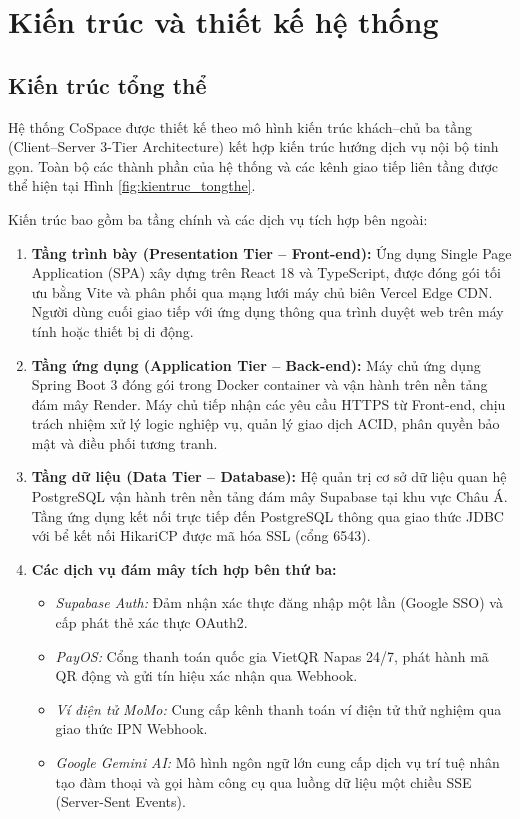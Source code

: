 \chapter{Kiến trúc và thiết kế hệ thống}
\label{ch:thietke}

\section{Kiến trúc tổng thể}
\label{sec:kientruc}

Hệ thống CoSpace được thiết kế theo mô hình kiến trúc khách--chủ ba tầng (Client--Server 3-Tier Architecture) kết hợp kiến trúc hướng dịch vụ nội bộ tinh gọn. Toàn bộ các thành phần của hệ thống và các kênh giao tiếp liên tầng được thể hiện tại Hình \ref{fig:kientruc_tongthe}.


Kiến trúc bao gồm ba tầng chính và các dịch vụ tích hợp bên ngoài:
\begin{enumerate}
    \item \textbf{Tầng trình bày (Presentation Tier -- Front-end):} Ứng dụng Single Page Application (SPA) xây dựng trên React 18 và TypeScript, được đóng gói tối ưu bằng Vite và phân phối qua mạng lưới máy chủ biên Vercel Edge CDN. Người dùng cuối giao tiếp với ứng dụng thông qua trình duyệt web trên máy tính hoặc thiết bị di động.
    \item \textbf{Tầng ứng dụng (Application Tier -- Back-end):} Máy chủ ứng dụng Spring Boot 3 đóng gói trong Docker container và vận hành trên nền tảng đám mây Render. Máy chủ tiếp nhận các yêu cầu HTTPS từ Front-end, chịu trách nhiệm xử lý logic nghiệp vụ, quản lý giao dịch ACID, phân quyền bảo mật và điều phối tương tranh.
    \item \textbf{Tầng dữ liệu (Data Tier -- Database):} Hệ quản trị cơ sở dữ liệu quan hệ PostgreSQL vận hành trên nền tảng đám mây Supabase tại khu vực Châu Á. Tầng ứng dụng kết nối trực tiếp đến PostgreSQL thông qua giao thức JDBC với bể kết nối HikariCP được mã hóa SSL (cổng 6543).
    \item \textbf{Các dịch vụ đám mây tích hợp bên thứ ba:}
    \begin{itemize}
        \item \textit{Supabase Auth:} Đảm nhận xác thực đăng nhập một lần (Google SSO) và cấp phát thẻ xác thực OAuth2.
        \item \textit{PayOS:} Cổng thanh toán quốc gia VietQR Napas 24/7, phát hành mã QR động và gửi tín hiệu xác nhận qua Webhook.
        \item \textit{Ví điện tử MoMo:} Cung cấp kênh thanh toán ví điện tử thử nghiệm qua giao thức IPN Webhook.
        \item \textit{Google Gemini AI:} Mô hình ngôn ngữ lớn cung cấp dịch vụ trí tuệ nhân tạo đàm thoại và gọi hàm công cụ qua luồng dữ liệu một chiều SSE (Server-Sent Events).
    \end{itemize}
\end{enumerate}

